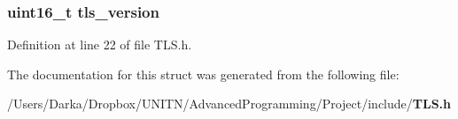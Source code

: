 \subsubsection[{tls\+\_\+version}]{\setlength{\rightskip}{0pt plus 5cm}uint16\+\_\+t tls\+\_\+version}\label{struct_t_l_s__parameters_a8fd63193690a09b75e0aaf9b971ed3df}


Definition at line 22 of file T\+L\+S.\+h.



The documentation for this struct was generated from the following file\+:\begin{DoxyCompactItemize}
\item 
/\+Users/\+Darka/\+Dropbox/\+U\+N\+I\+T\+N/\+Advanced\+Programming/\+Project/include/{\bf T\+L\+S.\+h}\end{DoxyCompactItemize}
